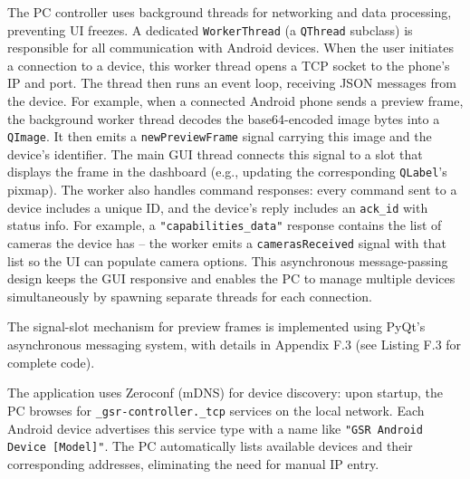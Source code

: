 The PC controller uses background threads for networking and data processing, preventing UI freezes. A dedicated \texttt{WorkerThread} (a \texttt{QThread} subclass) is responsible for all communication with Android devices. When the user initiates a connection to a device, this worker thread opens a TCP socket to the phone's IP and port. The thread then runs an event loop, receiving JSON messages from the device. For example, when a connected Android phone sends a preview frame, the background worker thread decodes the base64-encoded image bytes into a \texttt{QImage}. It then emits a \texttt{newPreviewFrame} signal carrying this image and the device's identifier. The main GUI thread connects this signal to a slot that displays the frame in the dashboard (e.g., updating the corresponding \texttt{QLabel}'s pixmap). The worker also handles command responses: every command sent to a device includes a unique ID, and the device's reply includes an \texttt{ack\_id} with status info. For example, a \texttt{"capabilities\_data"} response contains the list of cameras the device has -- the worker emits a \texttt{camerasReceived} signal with that list so the UI can populate camera options. This asynchronous message-passing design keeps the GUI responsive and enables the PC to manage multiple devices simultaneously by spawning separate threads for each connection.

The signal-slot mechanism for preview frames is implemented using PyQt's asynchronous messaging system, with details in Appendix F.3 (see Listing F.3 for complete code).

The application uses Zeroconf (mDNS) \cite{ref19} for device discovery: upon startup, the PC browses for \texttt{\_gsr-controller.\_tcp} services on the local network. Each Android device advertises this service type with a name like \texttt{"GSR Android Device [Model]"}. The PC automatically lists available devices and their corresponding addresses, eliminating the need for manual IP entry.

